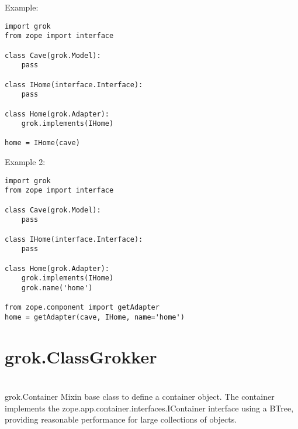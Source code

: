   \begin{bf}Example:\end{bf}

  \begin{verbatim}
import grok
from zope import interface

class Cave(grok.Model):
    pass

class IHome(interface.Interface):
    pass

class Home(grok.Adapter):
    grok.implements(IHome)

home = IHome(cave)
  \end{verbatim}

  \begin{bf}Example 2:\end{bf}

  \begin{verbatim}
import grok
from zope import interface

class Cave(grok.Model):
    pass

class IHome(interface.Interface):
    pass

class Home(grok.Adapter):
    grok.implements(IHome)
    grok.name('home')

from zope.component import getAdapter
home = getAdapter(cave, IHome, name='home')
  \end{verbatim}

\section{}

\section{}

\section{}

\section{grok.ClassGrokker}

\section{}

  \begin{classdesc*}{grok.Container}
    Mixin base class to define a container object. The container implements the
    zope.app.container.interfaces.IContainer interface using a BTree, providing
    reasonable performance for large collections of objects.
  \end{classdesc*}


